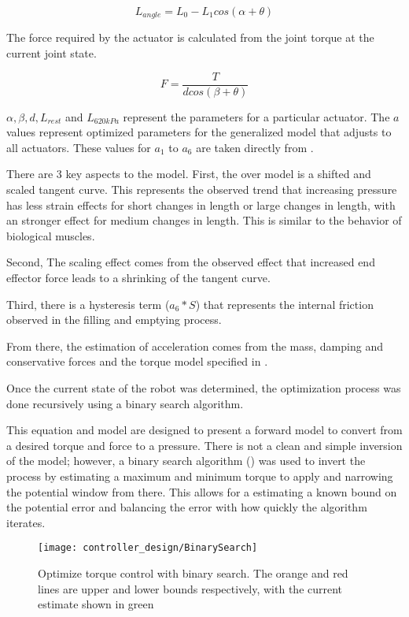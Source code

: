 \begin{equation}
L_{angle} = L_{0} - L_{1} cos(\alpha + \theta)
\end{equation}

The force required by the actuator is calculated from the joint torque at the current joint state.

\begin{equation}
F = \dfrac{T}{d cos(\beta + \theta)}
\end{equation}

$\alpha, \beta, d, L_{rest}$ and $L_{620 kPa}$ represent the parameters for a 
particular actuator. The $a$ values represent optimized parameters
for the generalized model that adjusts to all actuators. These values for $a_{1}$ to $a_{6}$ are taken directly from \cite{HuntPMuscles}.

There are 3 key aspects to the model. First, the over model is a shifted and 
scaled tangent curve. This represents the observed trend that increasing 
pressure has less strain effects for short changes in length or large changes in 
length, with an stronger effect for medium changes in length. This is similar to 
the behavior of biological muscles.

Second, The scaling effect comes from the observed
effect that increased end effector force leads to a shrinking of the tangent 
curve.

Third, there is a hysteresis term ($a_{6} * S$) that represents the internal
friction observed in the filling and emptying process.

From there, the estimation of acceleration comes from the mass, 
damping and conservative forces and the torque model specified in
.


Once the current state of the robot was determined, the optimization process was 
done recursively using a binary search algorithm. 

This equation and model are designed to present a forward model to convert from 
a desired torque and force to a pressure. There is not a clean and simple 
inversion of the model; however, a binary search algorithm 
() was used to invert 
the process by estimating a maximum and minimum torque to apply and narrowing 
the
potential window from there. This allows for a estimating a known bound on the 
potential error and balancing the error with how quickly the algorithm iterates.

\begin{figure}
\centering
\texttt{[image: controller\_design/BinarySearch]}
\caption{Optimize torque control with binary search. The orange and red lines are upper and lower bounds respectively, with the current estimate shown in green}
\label{fig:BinarySearch}
\end{figure}

